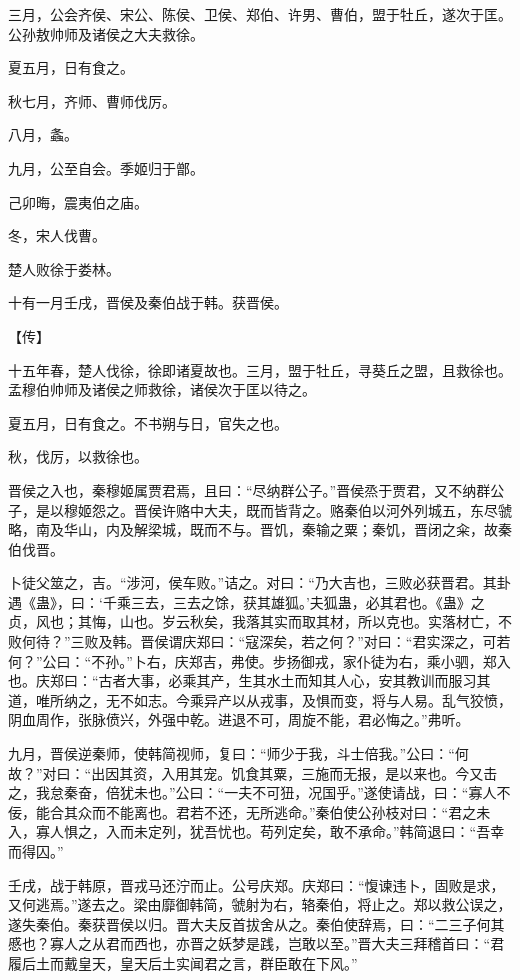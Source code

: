 \documentclass[a4paper,12pt,UTF8,twoside]{ctexbook}
\begin{document}
三月，公会齐侯、宋公、陈侯、卫侯、郑伯、许男、曹伯，盟于牡丘，遂次于匡。公孙敖帅师及诸侯之大夫救徐。

夏五月，日有食之。

秋七月，齐师、曹师伐厉。

八月，螽。

九月，公至自会。季姬归于鄫。

己卯晦，震夷伯之庙。

冬，宋人伐曹。

楚人败徐于娄林。

十有一月壬戌，晋侯及秦伯战于韩。获晋侯。

【传】

十五年春，楚人伐徐，徐即诸夏故也。三月，盟于牡丘，寻葵丘之盟，且救徐也。孟穆伯帅师及诸侯之师救徐，诸侯次于匡以待之。

夏五月，日有食之。不书朔与日，官失之也。

秋，伐厉，以救徐也。

晋侯之入也，秦穆姬属贾君焉，且曰：“尽纳群公子。”晋侯烝于贾君，又不纳群公子，是以穆姬怨之。晋侯许赂中大夫，既而皆背之。赂秦伯以河外列城五，东尽虢略，南及华山，内及解梁城，既而不与。晋饥，秦输之粟；秦饥，晋闭之籴，故秦伯伐晋。

卜徒父筮之，吉。“涉河，侯车败。”诘之。对曰：“乃大吉也，三败必获晋君。其卦遇《蛊》，曰：‘千乘三去，三去之馀，获其雄狐。’夫狐蛊，必其君也。《蛊》之贞，风也；其悔，山也。岁云秋矣，我落其实而取其材，所以克也。实落材亡，不败何待？”三败及韩。晋侯谓庆郑曰：“寇深矣，若之何？”对曰：“君实深之，可若何？”公曰：“不孙。”卜右，庆郑吉，弗使。步扬御戎，家仆徒为右，乘小驷，郑入也。庆郑曰：“古者大事，必乘其产，生其水土而知其人心，安其教训而服习其道，唯所纳之，无不如志。今乘异产以从戎事，及惧而变，将与人易。乱气狡愤，阴血周作，张脉偾兴，外强中乾。进退不可，周旋不能，君必悔之。”弗听。

九月，晋侯逆秦师，使韩简视师，复曰：“师少于我，斗士倍我。”公曰：“何故？”对曰：“出因其资，入用其宠。饥食其粟，三施而无报，是以来也。今又击之，我怠秦奋，倍犹未也。”公曰：“一夫不可狃，况国乎。”遂使请战，曰：“寡人不佞，能合其众而不能离也。君若不还，无所逃命。”秦伯使公孙枝对曰：“君之未入，寡人惧之，入而未定列，犹吾忧也。苟列定矣，敢不承命。”韩简退曰：“吾幸而得囚。”

壬戌，战于韩原，晋戎马还泞而止。公号庆郑。庆郑曰：“愎谏违卜，固败是求，又何逃焉。”遂去之。梁由靡御韩简，虢射为右，辂秦伯，将止之。郑以救公误之，遂失秦伯。秦获晋侯以归。晋大夫反首拔舍从之。秦伯使辞焉，曰：“二三子何其慼也？寡人之从君而西也，亦晋之妖梦是践，岂敢以至。”晋大夫三拜稽首曰：“君履后土而戴皇天，皇天后土实闻君之言，群臣敢在下风。”
\end{document}
